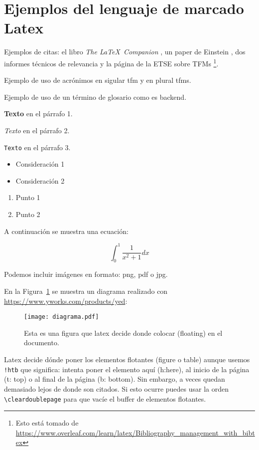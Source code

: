 \section{Ejemplos del lenguaje de marcado Latex}

Ejemplos de citas: el libro \textit{The \LaTeX\ Companion}
\cite{latexcompanion}, un paper de Einstein \cite{einstein}, dos informes técnicos de relevancia \cite{NIST:Cloud-2011,OWASP:Top10-2017} y la página de la ETSE sobre TFMs \cite{ETSE:online}\footnote{Esto está tomado de
\url{https://www.overleaf.com/learn/latex/Bibliography_management_with_bibtex}}.

Ejemplo de uso de acrónimos en sigular \gls{tfm} y en plural \glspl{tfm}.

Ejemplo de uso de un término de glosario como es \gls{backend}.


  \textbf{Texto} en el párrafo 1.

  \textit{Texto} en el párrafo 2.

  \texttt{Texto} en el párrafo 3.


  \begin{itemize}
  \item Consideración 1
  \item Consideración 2
  \end{itemize}

  \vspace{0.5cm}

  \begin{enumerate}
  \item Punto 1
  \item Punto 2
  \end{enumerate}

A continuación se muestra una ecuación:

  \[ \int_{0}^{1}\frac{1}{x^2+1} dx \]

  Podemos incluir imágenes en formato: png, pdf o jpg.

  En la Figura~\ref{fig:diagrama} se muestra un diagrama realizado con \href{yed}{https://www.yworks.com/products/yed}:

  \begin{figure}[!htb]
    \texttt{[image: diagrama.pdf]}
    \caption{Esta es una figura que latex decide donde colocar (floating) en el documento.}
    \label{fig:diagrama}
    \end{figure}

    Latex decide dónde poner los elementos flotantes (figure o table)
    aunque usemos \verb#!htb# que significa: intenta poner el elemento
    aquí (h:here), al inicio de la página (t: top) o al final de la
    página (b: bottom). Sin embargo, a veces quedan demasiado lejos de
    donde son citados. Si esto ocurre puedes usar la orden
    \verb#\cleardoublepage# para que vacíe el buffer de elementos flotantes.

